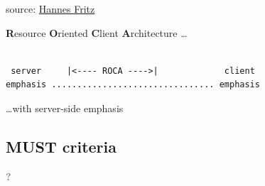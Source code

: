 \documentclass{beamer}
\begin{document}
{
  \begin{frame}
    \vspace*{6.7cm}
    \tiny source: \href{http://www.flickr.com/photos/sensorsicht/5338348801/}{Hannes Fritz}

  \end{frame}
}


\begin{frame}[fragile]{\insertsectionhead}
  \textbf{R}esource \textbf{O}riented \textbf{C}lient \textbf{A}rchitecture \dots

  \begin{verbatim}

 server     |<---- ROCA ---->|             client
emphasis ................................ emphasis
  \end{verbatim}

  \dots with server-side emphasis

\end{frame}

\subsection{MUST criteria}

\begin{frame}
  \vspace*{-1cm}
  \textcolor{gray}{
    \begin{center}
      \textbf{
        \fontsize{60}{50}\selectfont ?
      }
    \end{center}
  }
\end{frame}
\end{document}
